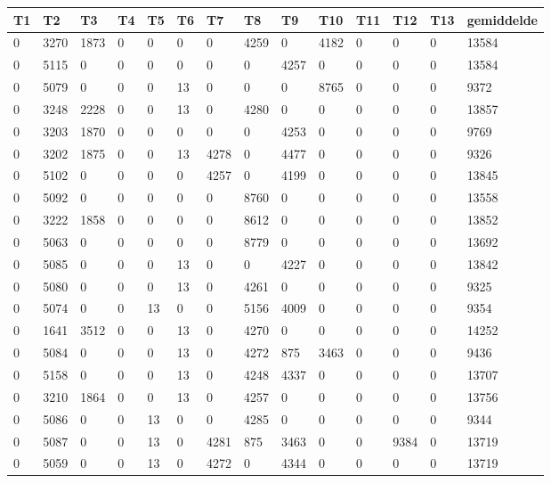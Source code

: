 \begin{tabular}{ | l | l | l | l | l | l | l | l | l | l | l | l | l || l | }
\hline
	T1 & T2 & T3 & T4 & T5 & T6 & T7 & T8 & T9 & T10 & T11 & T12 & T13 & gemiddelde \\ \hline
	0 & 3270 & 1873 & 0 & 0 & 0 & 0 & 4259 & 0 & 4182 & 0 & 0 & 0 & 13584 \\ \hline
	0 & 5115 & 0 & 0 & 0 & 0 & 0 & 0 & 4257 & 0 & 0 & 0 & 0 & 13584 \\ \hline
	0 & 5079 & 0 & 0 & 0 & 13 & 0 & 0 & 0 & 8765 & 0 & 0 & 0 & 9372 \\ \hline
	0 & 3248 & 2228 & 0 & 0 & 13 & 0 & 4280 & 0 & 0 & 0 & 0 & 0 & 13857 \\ \hline
	0 & 3203 & 1870 & 0 & 0 & 0 & 0 & 0 & 4253 & 0 & 0 & 0 & 0 & 9769 \\ \hline
	0 & 3202 & 1875 & 0 & 0 & 13 & 4278 & 0 & 4477 & 0 & 0 & 0 & 0 & 9326 \\ \hline
	0 & 5102 & 0 & 0 & 0 & 0 & 4257 & 0 & 4199 & 0 & 0 & 0 & 0 & 13845 \\ \hline
	0 & 5092 & 0 & 0 & 0 & 0 & 0 & 8760 & 0 & 0 & 0 & 0 & 0 & 13558 \\ \hline
	0 & 3222 & 1858 & 0 & 0 & 0 & 0 & 8612 & 0 & 0 & 0 & 0 & 0 & 13852 \\ \hline
	0 & 5063 & 0 & 0 & 0 & 0 & 0 & 8779 & 0 & 0 & 0 & 0 & 0 & 13692 \\ \hline
	0 & 5085 & 0 & 0 & 0 & 13 & 0 & 0 & 4227 & 0 & 0 & 0 & 0 & 13842 \\ \hline
	0 & 5080 & 0 & 0 & 0 & 13 & 0 & 4261 & 0 & 0 & 0 & 0 & 0 & 9325 \\ \hline
	0 & 5074 & 0 & 0 & 13 & 0 & 0 & 5156 & 4009 & 0 & 0 & 0 & 0 & 9354 \\ \hline
	0 & 1641 & 3512 & 0 & 0 & 13 & 0 & 4270 & 0 & 0 & 0 & 0 & 0 & 14252 \\ \hline
	0 & 5084 & 0 & 0 & 0 & 13 & 0 & 4272 & 875 & 3463 & 0 & 0 & 0 & 9436 \\ \hline
	0 & 5158 & 0 & 0 & 0 & 13 & 0 & 4248 & 4337 & 0 & 0 & 0 & 0 & 13707 \\ \hline
	0 & 3210 & 1864 & 0 & 0 & 13 & 0 & 4257 & 0 & 0 & 0 & 0 & 0 & 13756 \\ \hline
	0 & 5086 & 0 & 0 & 13 & 0 & 0 & 4285 & 0 & 0 & 0 & 0 & 0 & 9344 \\ \hline
	0 & 5087 & 0 & 0 & 13 & 0 & 4281 & 875 & 3463 & 0 & 0 & 9384 & 0 & 13719\\ \hline	
	0 & 5059 & 0 & 0 & 13 & 0 & 4272 & 0 & 4344 & 0 & 0 & 0 & 0 & 13719 \\ \hline

\end{tabular}
